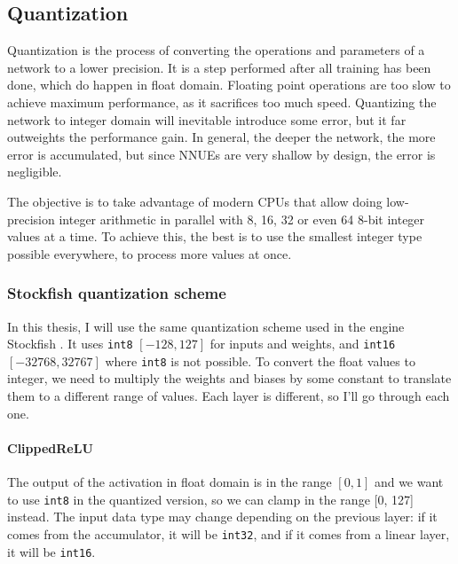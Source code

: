 \subsection{Quantization}


Quantization is the process of converting the operations and parameters of a network to a lower precision. It is a step performed after all training has been done, which do happen in float domain. Floating point operations are too slow to achieve maximum performance, as it sacrifices too much speed. Quantizing the network to integer domain will inevitable introduce some error, but it far outweights the performance gain. In general, the deeper the network, the more error is accumulated, but since NNUEs are very shallow by design, the error is negligible.

The objective is to take advantage of modern CPUs that allow doing low-precision integer arithmetic in parallel with 8, 16, 32 or even 64 8-bit integer values at a time. To achieve this, the best is to use the smallest integer type possible everywhere, to process more values at once.

\subsubsection{Stockfish quantization scheme}

\def\int#1{\texttt{int#1}}

In this thesis, I will use the same quantization scheme used in the engine Stockfish \cite{nnue-pytorch}. It uses \int{8} $[-128, 127]$ for inputs and weights, and \int{16} $[-32768, 32767]$ where \int{8} is not possible.
To convert the float values to integer, we need to multiply the weights and biases by some constant to translate them to a different range of values. Each layer is different, so I'll go through each one.


\paragraph[short]{ClippedReLU} The output of the activation in float domain is in the range $[0, 1]$ and we want to use \int{8} in the quantized version, so we can clamp in the range [0, 127] instead. The input data type may change depending on the previous layer: if it comes from the accumulator, it will be \int{32}, and if it comes from a linear layer, it will be \int{16}.

